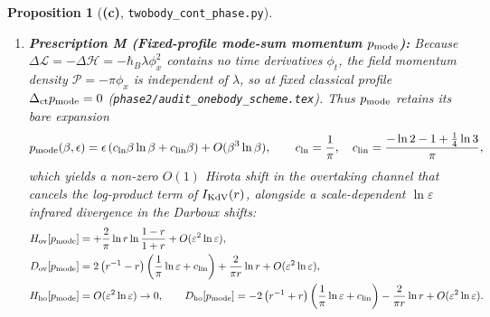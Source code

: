 \documentclass[11pt,a4paper]{article}
\newcommand{\Lc}{\textbf{(c)}}
\newcommand{\script}[1]{\texttt{#1}}
\newtheorem{proposition}{Proposition}[section]
\begin{document}
\begin{proposition}[\Lc, \script{twobody\_cont\_phase.py}]
\begin{enumerate}
\begin{align}
D_{\rm ov}[p_{\rm can,matched}]&=-\frac{2}{\pi}\left(r^{-1}-r\right)-\frac{1}{3\pi}\left(r^{-1}-r^3\right)\varepsilon^2+O(\varepsilon^4)
\qquad\left(\text{vs.\ }-\frac{8}{\pi}(r^{-1}-r)\text{ for }p_{\rm can,ac}\right),\label{eq:D_ov_can_m}\\
H_{\rm ho}[p_{\rm can,matched}]&=-\frac{6}{\pi}r\varepsilon^2+O(\varepsilon^4)\xrightarrow{\varepsilon\to 0}0,\label{eq:H_ho_can_m}\\
D_{\rm ho}[p_{\rm can,matched}]&=+\frac{2}{\pi}\left(r^{-1}+r\right)+\frac{1}{\pi}\left[\frac13\left(r^{-1}+r^3\right)-\frac{28}{9}r\right]\varepsilon^2+O(\varepsilon^4)
\qquad\left(\text{vs.\ }+\frac{8}{\pi}(r^{-1}+r)\text{ for }p_{\rm can,ac}\right).\label{eq:D_ho_can_m}
\end{align}

\item \textbf{Prescription M (Fixed-profile mode-sum momentum $p_{\rm mode}$):}
Because $\Delta\mathcal{L}=-\Delta\mathcal{H}=-\hbar_B\lambda\phi_x^2$ contains no time derivatives $\phi_t$, the field momentum density $\mathcal{P}=-\pi\phi_x$ is independent of $\lambda$, so at fixed classical profile $\Delta_{\rm ct}p_{\rm mode}=0$ (\texttt{phase2/audit\_onebody\_scheme.tex}). Thus $p_{\rm mode}$ retains its bare expansion
\begin{equation}\label{eq:p_mode_exp}
p_{\rm mode}(\beta,\epsilon)=\epsilon\left(c_{\ln}\beta\ln\beta+c_{\rm lin}\beta\right)+O(\beta^3\ln\beta),\qquad
c_{\ln}=\frac{1}{\pi},\quad c_{\rm lin}=\frac{-\ln 2-1+\frac14\ln 3}{\pi},
\end{equation}
which yields a non-zero $O(1)$ Hirota shift in the overtaking channel that cancels the log-product term of $I_{\rm KdV}(r)$, alongside a scale-dependent $\ln\varepsilon$ infrared divergence in the Darboux shifts:
\begin{align}
H_{\rm ov}[p_{\rm mode}]&=+\frac{2}{\pi}\ln r\ln\frac{1-r}{1+r}+O(\varepsilon^2\ln\varepsilon),\label{eq:H_ov_mode}\\
D_{\rm ov}[p_{\rm mode}]&=2\left(r^{-1}-r\right)\left(\frac{1}{\pi}\ln\varepsilon+c_{\rm lin}\right)+\frac{2}{\pi r}\ln r+O(\varepsilon^2\ln\varepsilon),\label{eq:D_ov_mode}\\
H_{\rm ho}[p_{\rm mode}]&=O(\varepsilon^2\ln\varepsilon)\to 0,\qquad
D_{\rm ho}[p_{\rm mode}]=-2\left(r^{-1}+r\right)\left(\frac{1}{\pi}\ln\varepsilon+c_{\rm lin}\right)-\frac{2}{\pi r}\ln r+O(\varepsilon^2\ln\varepsilon).\label{eq:D_ho_mode}
\end{align}


\end{enumerate}
\end{proposition}
\end{document}
